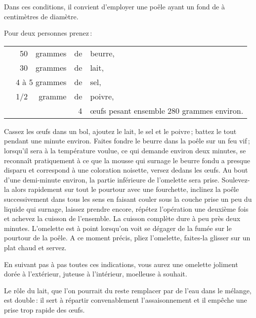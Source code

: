 Dans ces conditions, il convient d'employer une poêle ayant un fond de
{\mmm} à {\mmm} centimètres de diamètre.

\medskip

Pour deux personnes prenez :

\medskip

\setlength\tabcolsep{.2em}
\footnotesize
\begin{longtable}{rrrrp{16em}}
    & 50  & grammes & de & beurre,                                                                        \\
    & 30  & grammes & de & lait,                                                                          \\
    & \multicolumn{2}{r}{4 à 5 grammes} & de & sel,                                                       \\
    & 1/2 & gramme  & de & poivre,                                                                        \\
    &     &         &  4 & œufs pesant ensemble 280 grammes environ.                                      \\
\end{longtable}
\normalsize

Cassez les œufs dans un bol, ajoutez le lait, le sel et le poivre ; battez le
tout pendant une minute environ. Faites fondre le beurre dans la poêle sur un
feu vif ; lorsqu'il sera à la température voulue, ce qui demande environ deux
minutes, se reconnaît pratiquement à ce que la mousse qui surnage le beurre
fondu a presque disparu et correspond à une coloration noisette, versez dedans
les œufs. Au bout d'une demi-minute environ, la partie inférieure de l'omelette
sera prise. Soulevez-la alors rapidement sur tout le pourtour avec une
fourchette, inclinez la poêle successivement dans tous les sens en faisant
couler sous la couche prise un peu du liquide qui surnage, laissez prendre
encore, répétez l'opération une deuxième fois et achevez la cuisson de
l’ensemble. La cuisson complète dure à peu près deux minutes. L'omelette est
à point lorsqu'on voit se dégager de la fumée sur le pourtour de la poêle. A ce
moment précis, pliez l'omelette, faites-la glisser sur un plat chaud et servez.

En suivant pas à pas toutes ces indications, vous aurez une omelette joliment
dorée à l'extérieur, juteuse à l'intérieur, moelleuse à souhait.

Le rôle du lait, que l'on pourrait du reste remplacer par de l'eau dans le
mélange, est double : il sert à répartir convenablement l’assaisonnement et il
empêche une prise trop rapide des œufs.

